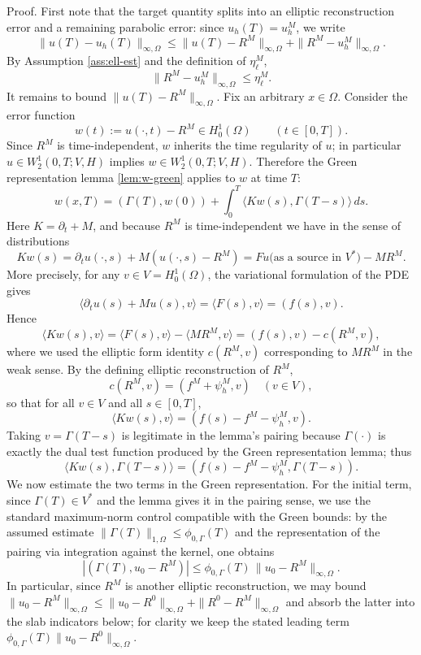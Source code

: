 \documentclass[11pt]{article}
\begin{document}
Proof. First note that the target quantity splits into an elliptic reconstruction error and a remaining parabolic error: since $u_h(T)=u_h^M$, we write
\[
\|u(T)-u_h(T)\|_{\infty,\Omega}
\le \|u(T)-R^M\|_{\infty,\Omega}+\|R^M-u_h^M\|_{\infty,\Omega}.
\]
By Assumption \ref{ass:ell-est} and the definition of $\eta_\ell^M$,
\[
\|R^M-u_h^M\|_{\infty,\Omega}\le \eta_\ell^M.
\]
It remains to bound $\|u(T)-R^M\|_{\infty,\Omega}$. Fix an arbitrary $x\in\Omega$. Consider the error function
\[
w(t):=u(\cdot,t)-R^M\in H^1_0(\Omega)\qquad (t\in[0,T]).
\]
Since $R^M$ is time-independent, $w$ inherits the time regularity of $u$; in particular $u\in W^1_2(0,T;V,H)$ implies $w\in W^1_2(0,T;V,H)$. Therefore the Green representation lemma \ref{lem:w-green} applies to $w$ at time $T$:
\[
w(x,T)=(\Gamma(T),w(0))+\int_0^T \langle Kw(s),\Gamma(T-s)\rangle\,ds.
\]
Here $K=\partial_t+M$, and because $R^M$ is time-independent we have in the sense of distributions
\[
Kw(s)=\partial_t u(\cdot,s)+M(u(\cdot,s)-R^M)=Fu\text{(as a source in }V^*)-MR^M.
\]
More precisely, for any $v\in V=H^1_0(\Omega)$, the variational formulation of the PDE gives
\[
\langle \partial_t u(s)+Mu(s),v\rangle=\langle F(s),v\rangle=(f(s),v).
\]
Hence
\[
\langle Kw(s),v\rangle=\langle F(s),v\rangle-\langle MR^M,v\rangle=(f(s),v)-c(R^M,v),
\]
where we used the elliptic form identity $c(R^M,v)$ corresponding to $MR^M$ in the weak sense. By the defining elliptic reconstruction of $R^M$,
\[
c(R^M,v)=(f^M+\psi_h^M,v)\quad (v\in V),
\]
so that for all $v\in V$ and all $s\in[0,T]$,
\[
\langle Kw(s),v\rangle=(f(s)-f^M-\psi_h^M,v).
\]
Taking $v=\Gamma(T-s)$ is legitimate in the lemma's pairing because $\Gamma(\cdot)$ is exactly the dual test function produced by the Green representation lemma; thus
\[
\langle Kw(s),\Gamma(T-s)\rangle=(f(s)-f^M-\psi_h^M,\Gamma(T-s)).
\]
We now estimate the two terms in the Green representation. For the initial term, since $\Gamma(T)\in V^*$ and the lemma gives it in the pairing sense, we use the standard maximum-norm control compatible with the Green bounds: by the assumed estimate $\|\Gamma(T)\|_{1,\Omega}\le \phi_{0,\Gamma}(T)$ and the representation of the pairing via integration against the kernel, one obtains
\[
|(\Gamma(T),u_0-R^M)|\le \phi_{0,\Gamma}(T)\,\|u_0-R^M\|_{\infty,\Omega}.
\]
In particular, since $R^M$ is another elliptic reconstruction, we may bound $\|u_0-R^M\|_{\infty,\Omega}\le \|u_0-R^0\|_{\infty,\Omega}+\|R^0-R^M\|_{\infty,\Omega}$ and absorb the latter into the slab indicators below; for clarity we keep the stated leading term $\phi_{0,\Gamma}(T)\|u_0-R^0\|_{\infty,\Omega}$.
\end{document}
